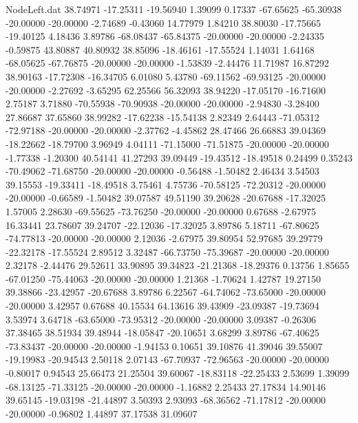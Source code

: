 \begin{filecontents}{NodeLeft.dat}
  38.74971  -17.25311  -19.56940     1.39099    0.17337  -67.65625  -65.30938  -20.00000  -20.00000   -2.74689   -0.43060   14.77979    1.84210
  38.80030  -17.75665  -19.40125     4.18436    3.89786  -68.08437  -65.84375  -20.00000  -20.00000   -2.24335   -0.59875   43.80887   40.80932
  38.85096  -18.46161  -17.55524     1.14031    1.64168  -68.05625  -67.76875  -20.00000  -20.00000   -1.53839   -2.44476   11.71987   16.87292
  38.90163  -17.72308  -16.34705     6.01080    5.43780  -69.11562  -69.93125  -20.00000  -20.00000   -2.27692   -3.65295   62.25566   56.32093
  38.94220  -17.05170  -16.71600     2.75187    3.71880  -70.55938  -70.90938  -20.00000  -20.00000   -2.94830   -3.28400   27.86687   37.65860
  38.99282  -17.62238  -15.54138     2.82349    2.64443  -71.05312  -72.97188  -20.00000  -20.00000   -2.37762   -4.45862   28.47466   26.66883
  39.04369  -18.22662  -18.79700     3.96949    4.04111  -71.15000  -71.51875  -20.00000  -20.00000   -1.77338   -1.20300   40.54141   41.27293
  39.09449  -19.43512  -18.49518     0.24499    0.35243  -70.49062  -71.68750  -20.00000  -20.00000   -0.56488   -1.50482    2.46434    3.54503
  39.15553  -19.33411  -18.49518     3.75461    4.75736  -70.58125  -72.20312  -20.00000  -20.00000   -0.66589   -1.50482   39.07587   49.51190
  39.20628  -20.67688  -17.32025     1.57005    2.28630  -69.55625  -73.76250  -20.00000  -20.00000    0.67688   -2.67975   16.33441   23.78607
  39.24707  -22.12036  -17.32025     3.89786    5.18711  -67.80625  -74.77813  -20.00000  -20.00000    2.12036   -2.67975   39.80954   52.97685
  39.29779  -22.32178  -17.55524     2.89512    3.32487  -66.73750  -75.39687  -20.00000  -20.00000    2.32178   -2.44476   29.52611   33.90895
  39.34823  -21.21368  -18.29376     0.13756    1.85655  -67.01250  -75.44063  -20.00000  -20.00000    1.21368   -1.70624    1.42787   19.27150
  39.38866  -23.42957  -20.67688     3.89786    6.22567  -64.74062  -73.65000  -20.00000  -20.00000    3.42957    0.67688   40.15534   64.13616
  39.43909  -23.09387  -19.73694     3.53974    3.64718  -63.65000  -73.95312  -20.00000  -20.00000    3.09387   -0.26306   37.38465   38.51934
  39.48944  -18.05847  -20.10651     3.68299    3.89786  -67.40625  -73.83437  -20.00000  -20.00000   -1.94153    0.10651   39.10876   41.39046
  39.55007  -19.19983  -20.94543     2.50118    2.07143  -67.70937  -72.96563  -20.00000  -20.00000   -0.80017    0.94543   25.66473   21.25504
  39.60067  -18.83118  -22.25433     2.53699    1.39099  -68.13125  -71.33125  -20.00000  -20.00000   -1.16882    2.25433   27.17834   14.90146
  39.65145  -19.03198  -21.44897     3.50393    2.93093  -68.36562  -71.17812  -20.00000  -20.00000   -0.96802    1.44897   37.17538   31.09607

\end{filecontents}
